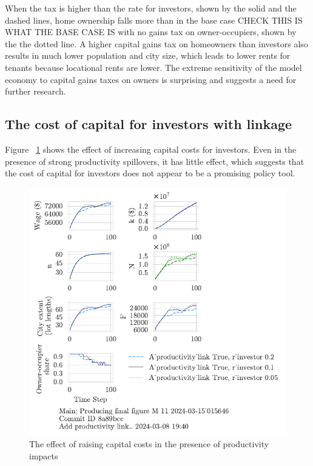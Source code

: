{When the tax is higher than the rate for investors, shown by the solid and the dashed lines,  home ownership falls more than in the base case {\color{red} CHECK THIS IS WHAT THE BASE CASE IS with no gains tax on owner-occupiers,  shown by the the dotted line.} A higher capital gains tax on homeowners than investors also results in much lower population and city size, which leads to lower rents for tenants because locational rents are lower. The extreme sensitivity of the model economy to capital gains taxes on owners is surprising and suggests a need for further research. 






\newpage
\subsection{The cost of capital for investors  with linkage}
Figure ~\ref{fig:Productivity_link_and_capital_ownership_trajectory} shows the effect of increasing capital costs for investors. Even in the presence of strong productivity spillovers, it has little effect, which suggests that the cost of capital for investors does not appear to be a promising policy tool.

\begin{figure}[h!t]
    \centering
   \includegraphics[scale=1, trim={0 1.4cm 0 0},clip]{fig/With-productivity_link-r_investor-15_015646.pdf}
    \caption{The effect of raising capital costs in the presence of productivity impacts}
    \label{fig:Productivity_link_and_capital_ownership_trajectory}
\end{figure}



}
